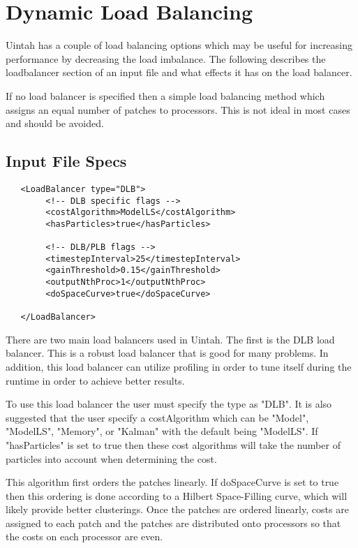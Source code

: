 \section{Dynamic Load Balancing} \label{loadbalancer}

Uintah has a couple of load balancing options which may be useful for increasing performance by decreasing
the load imbalance.  The following describes the loadbalancer section of an input file and what effects
it has on the load balancer.  

If no load balancer is specified then a simple load balancing method which assigns an equal number of patches
to processors. This is not ideal in most cases and should be avoided.

\subsection{Input File Specs}
\begin{lstlisting}
   <LoadBalancer type="DLB"> 
        <!-- DLB specific flags -->
        <costAlgorithm>ModelLS</costAlgorithm>
        <hasParticles>true</hasParticles>

        <!-- DLB/PLB flags -->
        <timestepInterval>25</timestepInterval>
        <gainThreshold>0.15</gainThreshold>
        <outputNthProc>1</outputNthProc>
        <doSpaceCurve>true</doSpaceCurve>

   </LoadBalancer>
\end{lstlisting}

There are two main load balancers used in Uintah.  The first is the DLB load balancer.
This is a robust load balancer that is good for many problems.  In addition,
this load balancer can utilize profiling in order to tune itself during the runtime
in order to achieve better results.  

To use this load balancer the user must specify the type as "DLB".  It is also suggested
that the user specify a costAlgorithm which can be "Model", "ModelLS", "Memory", or
"Kalman" with the default being "ModelLS".  If "hasParticles" is set to true then
these cost algorithms will take the number of particles into account when determining
the cost.

This algorithm first orders the patches linearly.  If doSpaceCurve is set to true
then this ordering is done according to a Hilbert Space-Filling curve, which will
likely provide better clusterings.  Once the patches are ordered linearly, costs
are assigned to each patch and the patches are distributed onto processors so that
the costs on each processor are even.  


